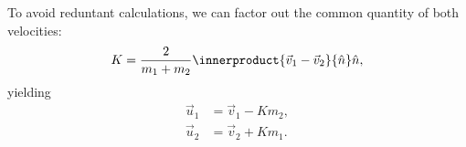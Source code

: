 To avoid reduntant calculations, we can factor out the common quantity of both velocities:
\begin{equation}
	K = \frac{2}{m_{1}+m_{2}}\innerproduct{\vec{v}_{1}-\vec{v}_{2}}{\hat{n}}\hat{n},
	\label{eq:elastic_collision_common_quantity}
\end{equation}
yielding
\begin{equation}
	\begin{aligned}
		\vec{u}_{1} & = \vec{v}_{1}-Km_{2}, \\
		\vec{u}_{2} & = \vec{v}_{2}+Km_{1}.
	\end{aligned}
	\label{eq:elastic_collision_final_equation}
\end{equation}
